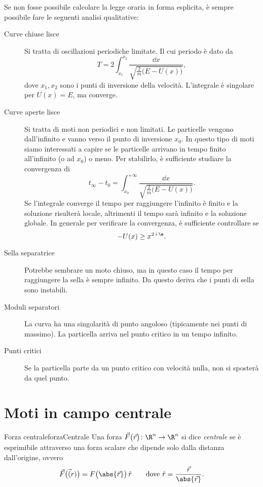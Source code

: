 \begin{enumerate}
	      Se non fosse possibile calcolare la legge oraria in forma esplicita, è sempre possibile fare le seguenti analisi qualitative:
	      \begin{description}
		      \item[Curve chiuse lisce] Si tratta di oscillazioni periodiche limitate. Il cui periodo è dato da
			      \[
				      T = 2\int_{x_1}^{x_2} \frac{\dd x}{\sqrt{\frac{2}{m}\big(E-U(x)\big)}},
			      \]
			      dove \(x_1,x_2\) sono i punti di inversione della velocità.
			      L'integrale è singolare per \(U(x)=E\), ma converge.
		      \item[Curve aperte lisce] Si tratta di moti non periodici e non limitati.
			      Le particelle vengono dall'infinito e vanno verso il punto di inversione \(x_0\).
			      In questo tipo di moti siamo interessati a capire se le particelle arrivano in tempo finito all'infinito (o ad \(x_0\)) o meno. Per stabilirlo, è sufficiente studiare la convergenza di 
			      \[
				      t_{\infty} - t_0 = \int_{x_0}^{+\infty} \frac{\dd x}{\sqrt{\frac{2}{m}\big(E-U(x)\big)}}.
			      \]
			      Se l'integrale converge il tempo per raggiungere l'infinito è finito e la soluzione risulterà locale, altrimenti il tempo sarà infinito e la soluzione globale.
			      In generale per verificare la convergenza, è sufficiente controllare se
			      \[
				      -U(x) \ge x^{2+\e}.
			      \]
		      \item[Sella separatrice] Potrebbe sembrare un moto chiuso, ma in questo caso il tempo per raggiungere la sella è sempre infinito.
			      Da questo deriva che i punti di sella sono instabili.
		      \item[Moduli separatori] La curva ha una singolarità di punto angoloso (tipicamente nei punti di massimo).
			      La particella arriva nel punto critico in un tempo infinito.
		      \item[Punti critici] Se la particella parte da un punto critico con velocità nulla, non si sposterà da quel punto.
	      \end{description}
\end{enumerate}
%
%
\section{Moti in campo centrale}

\begin{defn}{Forza centrale}{forzaCentrale}
	Una forza \(\vec{F}\big(\vec{r}\big)\colon \R^n \to \R^n\) si dice \emph{centrale} se è esprimibile attraverso una forza scalare che dipende solo dalla distanza dall'origine, ovvero
	\[
		\vec{F}\big(\vec(r)\big) = F\big(\abs{\vec{r}}\big)\,\hat{r} \qquad\text{dove }\hat{r} = \frac{\vec{r}}{\abs{\vec{r}}}.
	\]
\end{defn}

